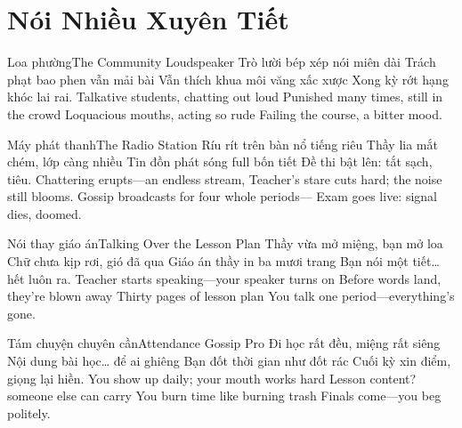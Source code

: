 \chapter{Nói Nhiều Xuyên Tiết}


\begin{tutuyetbox}{Loa phường}{The Community Loudspeaker}
Trò lười bép xép nói miên dài
Trách phạt bao phen vẫn mải bài
Vẫn thích khua môi văng xấc xược
Xong kỳ rớt hạng khóc lai rai.
\tcblower
Talkative students, chatting out loud 
Punished many times, still in the crowd 
Loquacious mouths, acting so rude 
Failing the course, a bitter mood.
\end{tutuyetbox}

\begin{tutuyetbox}{Máy phát thanh}{The Radio Station}
Ríu rít trên bàn nổ tiếng riêu
Thầy lia mắt chém, lớp càng nhiều
Tin đồn phát sóng full bốn tiết
Đề thi bật lên: tắt sạch, tiêu.
\tcblower
Chattering erupts—an endless stream,
Teacher’s stare cuts hard; the noise still blooms.
Gossip broadcasts for four whole periods—
Exam goes live: signal dies, doomed.
\end{tutuyetbox}


\begin{tutuyetbox}{Nói thay giáo án}{Talking Over the Lesson Plan}
Thầy vừa mở miệng, bạn mở loa
Chữ chưa kịp rơi, gió đã qua
Giáo án thầy in ba mươi trang
Bạn nói một tiết… hết luôn ra.
\tcblower
Teacher starts speaking—your speaker turns on
Before words land, they’re blown away
Thirty pages of lesson plan
You talk one period—everything’s gone.
\end{tutuyetbox}

\begin{tutuyetbox}{Tám chuyện chuyên cần}{Attendance Gossip Pro}
Đi học rất đều, miệng rất siêng
Nội dung bài học… để ai ghiêng
Bạn đốt thời gian như đốt rác
Cuối kỳ xin điểm, giọng lại hiền.
\tcblower
You show up daily; your mouth works hard
Lesson content? someone else can carry
You burn time like burning trash
Finals come—you beg politely.
\end{tutuyetbox}

